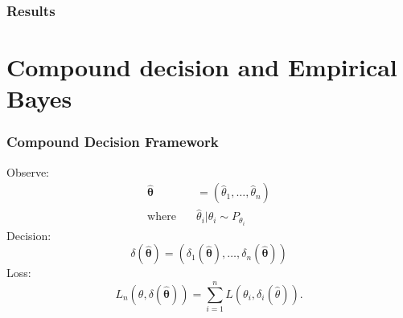 \documentclass[10pt, aspectratio=169]{beamer}
\begin{document}
\begin{frame}
  \frametitle{Results}
  \begin{table}\fontsize{6pt}{4pt}\selectfont
    
  \end{table}
\end{frame}

\section{Compound decision and Empirical Bayes}

\begin{frame}
  \frametitle{Compound Decision Framework}
  Observe:
  \begin{align*}
    \boldsymbol{\hat{\theta}} & =  (\hat{\theta}_1,\ldots, \hat{\theta}_n)  \\
    \text{where} \quad        & \hat{\theta}_i | \theta_i \sim P_{\theta_i}
  \end{align*}
  Decision:
  \begin{equation*}
    \delta(\boldsymbol{\hat{\theta}}) = (\delta_1(\boldsymbol{\hat{\theta}}), \ldots, \delta_n(\boldsymbol{\hat{\theta}}))
  \end{equation*}
  Loss:
  \begin{equation*}
    L_n(\theta, \delta(\boldsymbol{\hat{\theta}})) = \sum_{i=1}^n L(\theta_i, \delta_i(\hat{\theta})).
  \end{equation*}
\end{frame}
\end{document}
